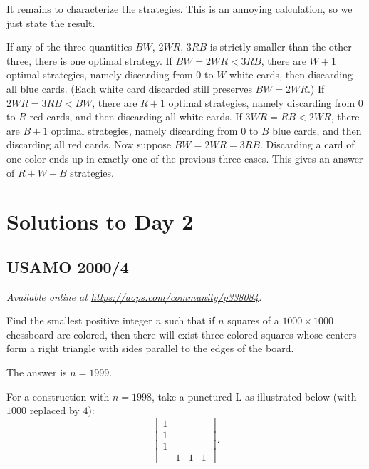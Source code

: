 \documentclass[11pt]{scrartcl}
\begin{document}
It remains to characterize the strategies.
This is an annoying calculation, so we just state the result.
\begin{itemize}
  \ii If any of the three quantities $BW$, $2WR$, $3RB$
  is strictly smaller than the other three,
  there is one optimal strategy.
  \ii If $BW = 2WR < 3RB$,
  there are $W+1$ optimal strategies,
  namely discarding from $0$ to $W$ white cards,
  then discarding all blue cards.
  (Each white card discarded still preserves $BW = 2WR$.)
  \ii If $2WR = 3RB < BW$,
  there are $R+1$ optimal strategies,
  namely discarding from $0$ to $R$ red cards,
  and then discarding all white cards.
  \ii If $3WR = RB < 2WR$,
  there are $B+1$ optimal strategies,
  namely discarding from $0$ to $B$ blue cards,
  and then discarding all red cards.
  \ii Now suppose $BW = 2WR = 3RB$.
  Discarding a card of one color
  ends up in exactly one of the previous three cases.
  This gives an answer of $R+W+B$ strategies.
\end{itemize}
\pagebreak

\section{Solutions to Day 2}
\subsection{USAMO 2000/4}
\textsl{Available online at \url{https://aops.com/community/p338084}.}
\begin{mdframed}[style=mdpurplebox,frametitle={Problem statement}]
Find the smallest positive integer $n$ such
that if $n$ squares of a $1000 \times 1000$ chessboard are colored,
then there will exist three colored squares
whose centers form a right triangle with sides
parallel to the edges of the board.
\end{mdframed}
The answer is $n = 1999$.

For a construction with $n = 1998$,
take a punctured L as illustrated below (with $1000$ replaced by $4$):
\[ \begin{bmatrix} 1 \\ 1 \\ 1 \\ & 1 & 1 & 1 \end{bmatrix}. \]
\end{document}
